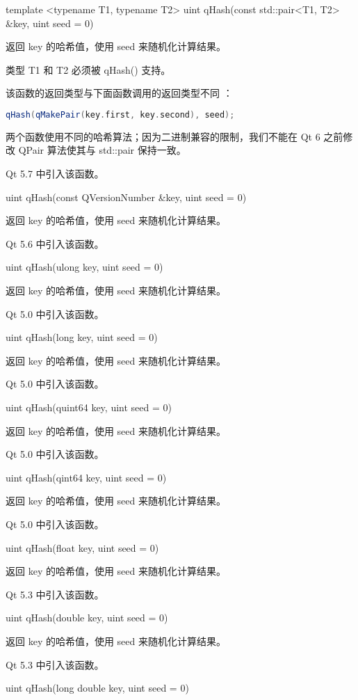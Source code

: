 template <typename T1, typename T2> uint qHash(const std::pair<T1, T2> \&key, uint seed = 0)

返回 key 的哈希值，使用 seed 来随机化计算结果。

类型 T1 和 T2 必须被 qHash() 支持。

\begin{notice}
该函数的返回类型与下面函数调用的返回类型不同 ：
\end{notice}

\begin{lstlisting}[language=C++]
qHash(qMakePair(key.first, key.second), seed);
\end{lstlisting}

两个函数使用不同的哈希算法；因为二进制兼容的限制，我们不能在 Qt 6 之前修改 QPair 算法使其与 std::pair 保持一致。

Qt 5.7 中引入该函数。

uint qHash(const QVersionNumber \&key, uint seed = 0)

返回 key 的哈希值，使用 seed 来随机化计算结果。

Qt 5.6 中引入该函数。

uint qHash(ulong key, uint seed = 0)

返回 key 的哈希值，使用 seed 来随机化计算结果。

Qt 5.0 中引入该函数。

uint qHash(long key, uint seed = 0)

返回 key 的哈希值，使用 seed 来随机化计算结果。

Qt 5.0 中引入该函数。

uint qHash(quint64 key, uint seed = 0)

返回 key 的哈希值，使用 seed 来随机化计算结果。

Qt 5.0 中引入该函数。

uint qHash(qint64 key, uint seed = 0)

返回 key 的哈希值，使用 seed 来随机化计算结果。

Qt 5.0 中引入该函数。

uint qHash(float key, uint seed = 0)

返回 key 的哈希值，使用 seed 来随机化计算结果。

Qt 5.3 中引入该函数。

uint qHash(double key, uint seed = 0)

返回 key 的哈希值，使用 seed 来随机化计算结果。

Qt 5.3 中引入该函数。

uint qHash(long double key, uint seed = 0)


